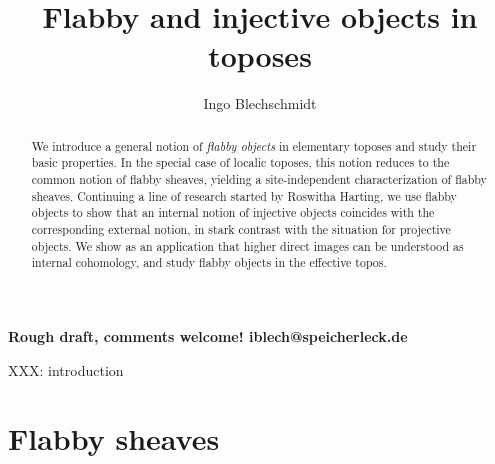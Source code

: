 \documentclass[oneside]{amsart}
\title{Flabby and injective objects in toposes}
\author{Ingo Blechschmidt}
\theoremstyle{definition}
\theoremstyle{plain}
\theoremstyle{remark}
\renewcommand{\_}{\mathpunct{.}\,}
\newcommand{\effective}{ef{}fective\xspace}
\begin{document}
\begin{abstract}
  We introduce a general notion of \emph{flabby objects} in elementary toposes
  and study their basic properties. In the special case of localic toposes, this
  notion reduces to the common notion of flabby sheaves, yielding a
  site-independent characterization of flabby sheaves. Continuing a line of
  research started by Roswitha Harting, we use flabby objects to
  show that an internal notion of injective objects coincides with the
  corresponding external notion, in stark contrast with the situation for
  projective objects. We show as an application that higher direct images can
  be understood as internal cohomology, and study flabby objects in the
  \effective topos.
\end{abstract}

\maketitle
\thispagestyle{empty}

{\centering \textbf{Rough draft, comments welcome! iblech@speicherleck.de}\par}
\bigskip

\noindent

XXX: introduction

\section{Flabby sheaves}
\end{document}
